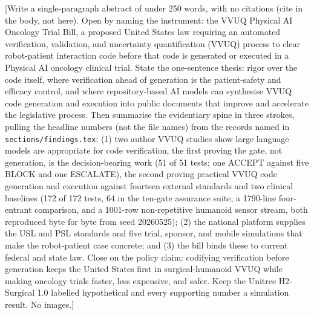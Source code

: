 
[Write a single-paragraph abstract of under 250 words, with no citations (cite in
the body, not here). Open by naming the instrument: the VVUQ Physical AI Oncology
Trial Bill, a proposed United States law requiring an automated verification,
validation, and uncertainty quantification (VVUQ) process to clear robot-patient
interaction code before that code is generated or executed in a Physical AI
oncology clinical trial. State the one-sentence thesis: rigor over the code
itself, where verification ahead of generation is the patient-safety and efficacy
control, and where repository-based AI models can synthesise VVUQ code generation
and execution into public documents that improve and accelerate the legislative
process. Then summarise the evidentiary spine in three strokes, pulling the
headline numbers (not the file names) from the records named in
\texttt{sections/findings.tex}: (1) two author VVUQ studies show large language
models are appropriate for code verification, the first proving the gate, not
generation, is the decision-bearing work (51 of 51 tests; one ACCEPT against five
BLOCK and one ESCALATE), the second proving practical VVUQ code generation and
execution against fourteen external standards and two clinical baselines (172 of
172 tests, 64 in the ten-gate assurance suite, a 1790-line four-entrant
comparison, and a 1001-row non-repetitive humanoid sensor stream, both reproduced
byte for byte from seed 20260525); (2) the national platform supplies the USL and
PSL standards and five trial, sponsor, and mobile simulations that make the
robot-patient case concrete; and (3) the bill binds these to current federal and
state law. Close on the policy claim: codifying verification before generation
keeps the United States first in surgical-humanoid VVUQ while making oncology
trials faster, less expensive, and safer. Keep the Unitree H2-Surgical 1.0
labelled hypothetical and every supporting number a simulation result. No images.]

